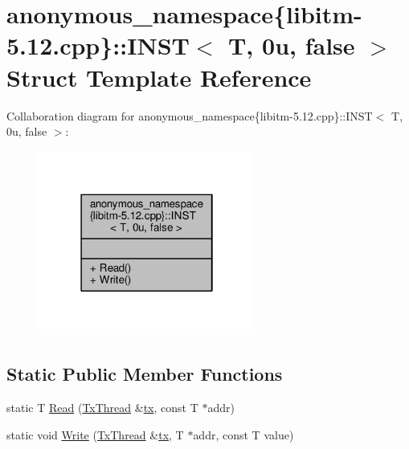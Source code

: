 \hypertarget{structanonymous__namespace_02libitm-5_812_8cpp_03_1_1INST_3_01T_00_010u_00_01false_01_4}{\section{anonymous\-\_\-namespace\{libitm-\/5.12.cpp\}\-:\-:I\-N\-S\-T$<$ T, 0u, false $>$ Struct Template Reference}
\label{structanonymous__namespace_02libitm-5_812_8cpp_03_1_1INST_3_01T_00_010u_00_01false_01_4}
}


Collaboration diagram for anonymous\-\_\-namespace\{libitm-\/5.12.cpp\}\-:\-:I\-N\-S\-T$<$ T, 0u, false $>$\-:
\nopagebreak
\begin{figure}[H]
\begin{center}
\leavevmode
\includegraphics[width=202pt]{structanonymous__namespace_02libitm-5_812_8cpp_03_1_1INST_3_01T_00_010u_00_01false_01_4__coll__graph}
\end{center}
\end{figure}
\subsection*{Static Public Member Functions}
\begin{DoxyCompactItemize}
\item 
static T \hyperlink{structanonymous__namespace_02libitm-5_812_8cpp_03_1_1INST_3_01T_00_010u_00_01false_01_4_a7878b852d67e028e6f85b45df1af5b26}{Read} (\hyperlink{structstm_1_1TxThread}{Tx\-Thread} \&\hyperlink{stmskip_8cc_a0f1c58699b83ce5a08bd9ee859250d72}{tx}, const T $\ast$addr)
\item 
static void \hyperlink{structanonymous__namespace_02libitm-5_812_8cpp_03_1_1INST_3_01T_00_010u_00_01false_01_4_a6f9cba4e0c3e57abefe18209b633c715}{Write} (\hyperlink{structstm_1_1TxThread}{Tx\-Thread} \&\hyperlink{stmskip_8cc_a0f1c58699b83ce5a08bd9ee859250d72}{tx}, T $\ast$addr, const T value)
\end{DoxyCompactItemize}


